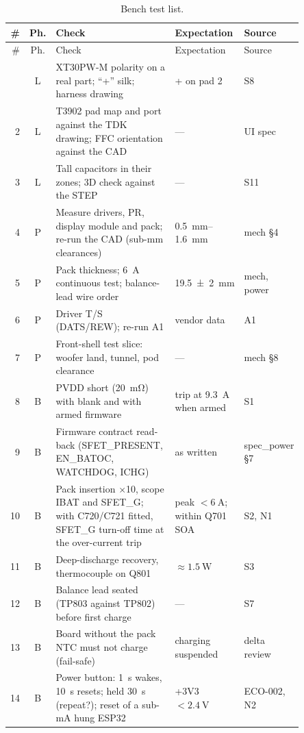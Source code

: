 {\small
\setlength{\tabcolsep}{3pt}
\begin{longtable}{@{}r c >{\raggedright\arraybackslash}p{0.52\linewidth} >{\raggedright\arraybackslash}p{0.21\linewidth} >{\raggedright\arraybackslash}p{0.12\linewidth}@{}}
\caption{Bench test list.}\label{tab:bench}\\
\toprule
\# & Ph. & Check & Expectation & Source \\
\midrule
\endfirsthead
\toprule \# & Ph. & Check & Expectation & Source \\ \midrule
\endhead
\bottomrule
\endfoot
1 & L & XT30PW-M polarity on a real part; ``+'' silk; harness drawing & + on pad 2 & S8 \\
2 & L & T3902 pad map and port against the TDK drawing; FFC orientation against the CAD & --- & UI spec \\
3 & L & Tall capacitors in their zones; 3D check against the STEP & --- & S11 \\
4 & P & Measure drivers, PR, display module and pack; re-run the CAD (sub-mm clearances) & \qtyrange{0.5}{1.6}{\milli\metre} & mech §4 \\
5 & P & Pack thickness; \qty{6}{\ampere} continuous test; balance-lead wire order & \qty{19.5 \pm 2}{\milli\metre} & mech, power \\
6 & P & Driver T/S (DATS/REW); re-run A1 & vendor data & A1 \\
7 & P & Front-shell test slice: woofer land, tunnel, pod clearance & --- & mech §8 \\
8 & B & PVDD short (\qty{20}{\milli\ohm}) with blank and with armed firmware & trip at \qty{9.3}{\ampere} when armed & S1 \\
9 & B & Firmware contract read-back (SFET\_PRESENT, EN\_BATOC, WATCHDOG, ICHG) & as written & spec\_power §7 \\
10 & B & Pack insertion $\times$10, scope IBAT and SFET\_G; with C720/C721 fitted, SFET\_G turn-off time at the over-current trip & peak $<\qty{6}{\ampere}$; within Q701 SOA & S2, N1 \\
11 & B & Deep-discharge recovery, thermocouple on Q801 & $\approx\qty{1.5}{\watt}$ & S3 \\
12 & B & Balance lead seated (TP803 against TP802) before first charge & --- & S7 \\
13 & B & Board without the pack NTC must not charge (fail-safe) & charging suspended & delta review \\
14 & B & Power button: \qty{1}{\second} wakes, \qty{10}{\second} resets; held \qty{30}{\second} (repeat?); reset of a sub-mA hung ESP32 & +3V3 $<\qty{2.4}{\volt}$ & ECO-002, N2 \\

\end{longtable}}
